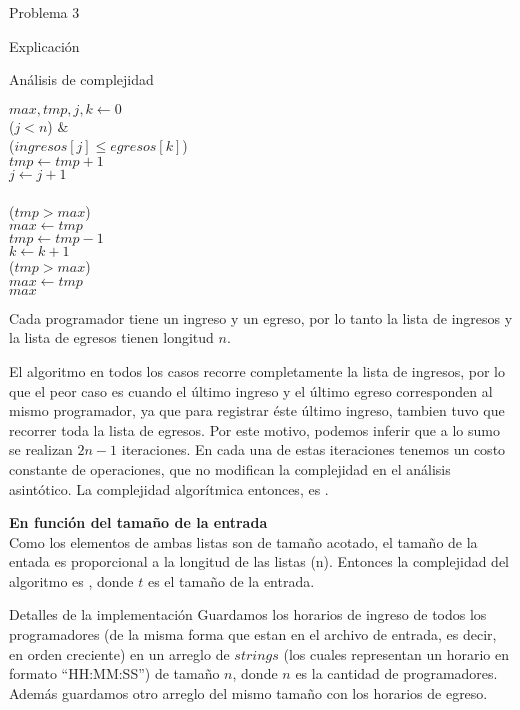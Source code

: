 \begin{section}{Problema 3}
\begin{subsection}{Explicación}
\begin{subsubsection}{Análisis de complejidad}
			\begin{pseudo}
				\tab $max,tmp,j,k \leftarrow 0$ \\
				\tab \WHILE($j< n$) &   \\
				\tab \tab \IF($ingresos[j]\leq egresos[k]$) \\
				\tab \tab \tab $tmp \leftarrow tmp+1$ \\
				\tab \tab \tab $j \leftarrow j+1$ \\
				\tab \tab \ELSE \\
				\tab \tab \tab \IF($tmp>max$) \\
				\tab \tab \tab \tab $max \leftarrow tmp$ \\
				\tab \tab \tab $tmp \leftarrow tmp - 1$ \\
				\tab \tab \tab $k \leftarrow k+1$ \\
				\tab \IF($tmp>max$) \\
				\tab \tab $max \leftarrow tmp$ \\
				\tab \RET $max$
			\end{pseudo}

			Cada programador tiene un ingreso y un egreso, por lo tanto la lista de ingresos y la lista de egresos tienen longitud $n$.

El algoritmo en todos los casos recorre completamente la lista de ingresos, por lo que el peor caso es cuando el último ingreso y el último egreso corresponden al mismo programador, ya que para registrar éste último ingreso, tambien tuvo que recorrer toda la lista de egresos. Por este motivo, podemos inferir que a lo sumo se realizan $2n -1$ iteraciones. En cada una de estas iteraciones tenemos un costo constante de operaciones, que no modifican la complejidad en el análisis asintótico. La complejidad algorítmica entonces, es .\VSP

		\noindent\textbf{En función del tamaño de la entrada}\\

			Como los elementos de ambas listas son de tamaño acotado, el tamaño de la entada es proporcional a la longitud de las listas (n). Entonces la complejidad del algoritmo es , donde $t$ es el tamaño de la entrada.

		\end{subsubsection}

	\end{subsection}

	\begin{subsection}{Detalles de la implementación}
	Guardamos los horarios de ingreso de todos los programadores (de la misma forma que estan en el archivo de entrada, es decir, en orden creciente) en un arreglo de $strings$ (los cuales representan un horario en formato ``HH:MM:SS'') de tamaño $n$, donde $n$ es la cantidad de programadores. Además guardamos otro arreglo del mismo tamaño con los horarios de egreso.
	

\end{subsection}
\end{section}
